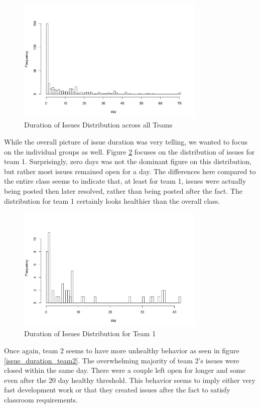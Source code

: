 \documentclass[conference]{IEEEtran}
\begin{document}
\begin{figure}[H]
    \centering
    \includegraphics[width=9cm]{../AprilProject/pic/distribution/issue_duration_distribution_total.png}
    \caption{Duration of Issues Distribution across all Teams}
    \label{issue_duration_total}
\end{figure}

While the overall picture of issue duration was very telling, we wanted to focus on the individual groups as well. Figure \ref{issue_duration_team1} focuses on the distribution of issues for team 1. Surprisingly, zero days was not the dominant figure on this distribution, but rather most issues remained open for a day. The differences here compared to the entire class seems to indicate that, at least for team 1, issues were actually being posted then later resolved, rather than being posted after the fact. The distribution for team 1 certainly looks healthier than the overall class.

\begin{figure}[H]
    \centering
    \includegraphics[width=9cm]{../AprilProject/pic/distribution/issue_duration_distribution_team1.png}
    \caption{Duration of Issues Distribution for Team 1}
    \label{issue_duration_team1}
\end{figure}

Once again, team 2 seems to have more unhealthy behavior as seen in figure \ref{issue_duration_team2}. The overwhelming majority of team 2's issues were closed within the same day. There were a couple left open for longer and some even after the 20 day healthy threshold. This behavior seems to imply either very fast development work or that they created issues after the fact to satisfy classroom requirements. 
\end{document}
